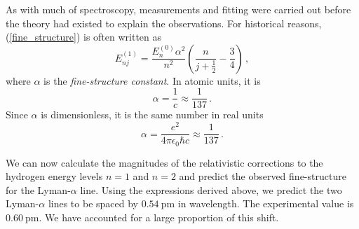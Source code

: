 \documentclass{article}
\theoremstyle{plain}\theoremheaderfont{\normalfont\itshape}\theorembodyfont{\rmfamily}\theoremseparator{.}\newtheorem*{rem}{Remark}\newtheorem*{ex}{Example}\newtheorem*{proof}{Proof}\newtheorem*{altp}{Alternative proof}
\theoremstyle{plain}\theoremheaderfont{\normalfont\bfseries}\theorembodyfont{\rmfamily}\theoremseparator{.}\newtheorem{thm}{Theorem}[section]\newtheorem{lem}[thm]{Lemma}\newtheorem{prop}[thm]{Proposition}\newtheorem*{cor}{Corollary}\newtheorem{defn}[thm]{Definition}\newtheorem{clm}[thm]{Claim}\newtheorem{clminproof}{Claim}
\theoremstyle{break}\theoremheaderfont{\normalfont\itshape}\theorembodyfont{\rmfamily}\theoremseparator{.\medskip}\newtheorem*{proofskip}{Proof}\newtheorem*{exs}{Examples}\newtheorem*{rems}{Remarks}
\theoremstyle{break}\theoremheaderfont{\normalfont\bfseries}\theorembodyfont{\rmfamily}\theoremseparator{.\medskip}\newtheorem{lemskip}[thm]{Lemma}\newtheorem{defnskip}[thm]{Definition}\newtheorem{propskip}[thm]{Proposition}\newtheorem{thmskip}[thm]{Theorem}
\numberwithin{equation}{section}
\newcommand{\unit}[1]{\ \mathrm{#1}}
\begin{document}
    As with much of spectroscopy, measurements and fitting were carried out before the theory had existed to explain the observations. For historical reasons, (\ref{fine_structure}) is often written as
    \begin{equation}
        E_{nj}^{(1)}=\frac{E_n^{(0)}\alpha^2}{n^2}\left(\frac{n}{j+\frac{1}{2}}-\frac{3}{4}\right)\,,
    \end{equation}
    where \(\alpha\) is the \textit{fine-structure constant}. In atomic units, it is
    \begin{equation}
        \alpha=\frac{1}{c}\approx\frac{1}{137}\,.
    \end{equation}
    Since \(\alpha\) is dimensionless, it is the same number in real units
    \begin{equation}
        \alpha=\frac{e^2}{4\pi\epsilon_0\hbar c}\approx\frac{1}{137}\,.
    \end{equation}

    We can now calculate the magnitudes of the relativistic corrections to the hydrogen energy levels \(n=1\) and \(n=2\) and predict the observed fine-structure for the Lyman-\(\alpha\) line. Using the expressions derived above, we predict the two Lyman-\(\alpha\) lines to be spaced by \(0.54\unit{pm}\) in wavelength. The experimental value is \(0.60\unit{pm}\). We have accounted for a large proportion of this shift.
\end{document}
